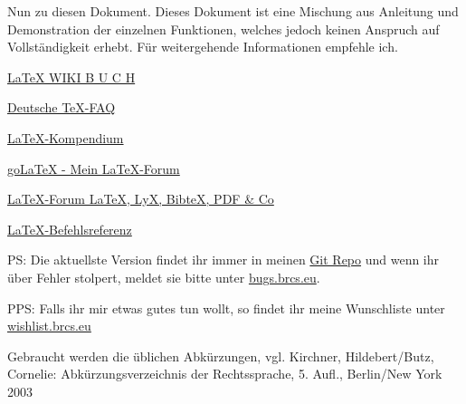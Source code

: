 \documentclass[oneside,headings=small,headsepline,12pt,a4paper,numbers=noenddot,chapterprefix=false,parskip=full-]{scrreprt}
\begin{document}
Nun zu diesen Dokument. Dieses Dokument ist eine Mischung aus Anleitung und Demonstration der einzelnen Funktionen, welches jedoch keinen Anspruch auf Vollständigkeit erhebt. Für weitergehende Informationen empfehle ich.
\begin{Auflistung}
	\item \href{http://www.linupedia.org/opensuse/LaTeX}{LaTeX WIKI B U C H}
	\item \href{http://projekte.dante.de/DanteFAQ/WebHome}{Deutsche TeX-FAQ}
	\item \href{http://de.wikibooks.org/wiki/LaTeX-Kompendium}{LaTeX-Kompendium}
	\item \href{http://golatex.de/}{goLaTeX - Mein LaTeX-Forum}
	\item \href{http://mrunix.de/forums/forumdisplay.php?f=38}{LaTeX-Forum LaTeX, LyX, BibteX, PDF \& Co}
	\item \href{http://www.weinelt.de/latex/index.html}{LaTeX-Befehlsreferenz}
\end{Auflistung}

PS: Die aktuellste Version findet ihr immer in meinen \href{https://github.com/BlackRocket/LaTeX-Script-Vorlage}{Git Repo} und wenn ihr über Fehler stolpert, meldet sie bitte unter \href{http://bugs.brcs.eu/index.php?project=2}{bugs.brcs.eu}.

PPS: Falls ihr mir etwas gutes tun wollt, so findet ihr meine Wunschliste unter \href{http://wishlist.brcs.eu}{wishlist.brcs.eu}
\clearpage

\setcounter{tocdepth}{3}
\tableofcontents

\nocite{*} %


Gebraucht werden die üblichen Abkürzungen, vgl. Kirchner, Hildebert/Butz, Cornelie: Abkürzungsverzeichnis der Rechtssprache, 5. Aufl., Berlin/New York 2003

\clearpage

\endgroup

\setcounter{page}{1}
\end{document}
